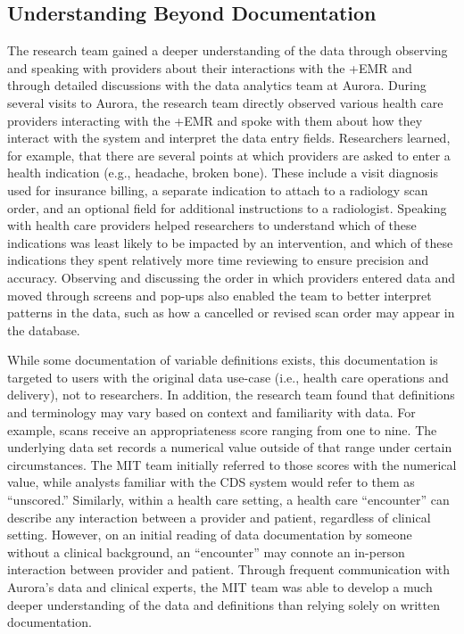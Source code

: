 \documentclass[
]{book}
\begin{document}
\hypertarget{understanding-beyond-documentation}{%
\subsection{Understanding Beyond Documentation}\label{understanding-beyond-documentation}}

The research team gained a deeper understanding of the data through observing and speaking with providers about their interactions with the +EMR\textbar{} and through detailed discussions with the data analytics team at Aurora. During several visits to Aurora, the research team directly observed various health care providers interacting with the +EMR\textbar{} and spoke with them about how they interact with the system and interpret the data entry fields. Researchers learned, for example, that there are several points at which providers are asked to enter a health indication (e.g., headache, broken bone). These include a visit diagnosis used for insurance billing, a separate indication to attach to a radiology scan order, and an optional field for additional instructions to a radiologist. Speaking with health care providers helped researchers to understand which of these indications was least likely to be impacted by an intervention, and which of these indications they spent relatively more time reviewing to ensure precision and accuracy. Observing and discussing the order in which providers entered data and moved through screens and pop-ups also enabled the team to better interpret patterns in the data, such as how a cancelled or revised scan order may appear in the database.

While some documentation of variable definitions exists, this documentation is targeted to users with the original data use-case (i.e., health care operations and delivery), not to researchers. In addition, the research team found that definitions and terminology may vary based on context and familiarity with data. For example, scans receive an appropriateness score ranging from one to nine. The underlying data set records a numerical value outside of that range under certain circumstances. The MIT team initially referred to those scores with the numerical value, while analysts familiar with the CDS system would refer to them as ``unscored.'' Similarly, within a health care setting, a health care ``encounter'' can describe any interaction between a provider and patient, regardless of clinical setting. However, on an initial reading of data documentation by someone without a clinical background, an ``encounter'' may connote an in-person interaction between provider and patient. Through frequent communication with Aurora's data and clinical experts, the MIT team was able to develop a much deeper understanding of the data and definitions than relying solely on written documentation.
\end{document}
